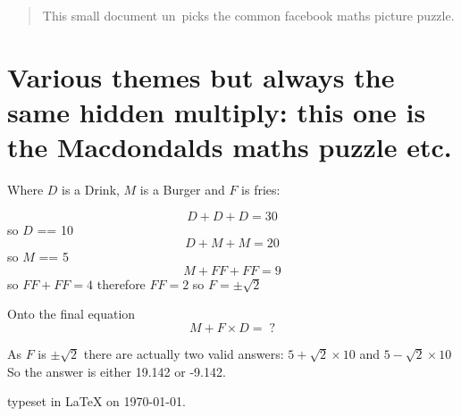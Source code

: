 \documentclass[a4paper,10pt]{article}
\title{}
\author{}
\newcommand{\theme}{Macdondalds}
\newcommand{\ttt}{D}
\newcommand{\topname}{Drink}
\newcommand{\mmm}{M}
\newcommand{\midname}{Burger}
\newcommand{\bbb}{F}
\newcommand{\botname}{fries}
\begin{document}
\maketitle

\begin{abstract}
This small document un~picks the common
facebook maths picture puzzle. %
\end{abstract}

\section{Various themes but always the same hidden multiply: this one is the {\theme} maths puzzle etc.}

Where $\ttt$ is a {\topname}, $\mmm$ is a {\midname} and $\bbb$ is {\botname}:

$$ \ttt + \ttt + \ttt = 30 $$
so $\ttt$ == 10
$$ \ttt + \mmm + \mmm = 20 $$
so $\mmm$ == 5
$$ \mmm + \bbb \bbb + \bbb \bbb = 9 $$
so $\bbb \bbb + \bbb \bbb = 4$ therefore $\bbb \bbb=2$ so $\bbb=\pm \sqrt{2}$

Onto the final equation
$$\mmm + \bbb \times \ttt = \; ? $$

As $\bbb$ is  $\pm \sqrt{2}$  there are actually two valid answers:
$ 5 + \sqrt{2} \times 10 $ and $ 5 - \sqrt{2} \times 10 $
So the answer is either 19.142 or -9.142.

\vspace{0.5cm}
typeset in {\LaTeX} on {\today}.
\end{document}
